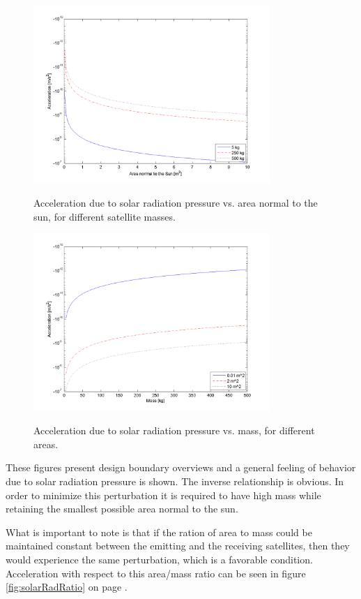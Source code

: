 \begin{figure}[ht!]
\centering
\includegraphics[width=0.8\textwidth, angle=0]{img/solPressureVarArea.png}
\label{fig:solarRadArea}
\caption{Acceleration due to solar radiation pressure vs. area normal to the sun, for different satellite masses.}
\end{figure}

\begin{figure}[ht!]
\centering
\includegraphics[width=0.8\textwidth, angle=0]{img/solPressureVarMass.png}
\label{fig:solarRadMass}
\caption{Acceleration due to solar radiation pressure vs. mass, for different areas.}
\end{figure}

These figures present design boundary overviews and a general feeling of behavior due to solar radiation pressure is shown. The inverse relationship is obvious. In order to minimize this perturbation it is required to have high mass while retaining the smallest possible area normal to the sun.

What is important to note is that if the ration of area to mass could be maintained constant between the emitting and the receiving satellites, then they would experience the same perturbation, which is a favorable condition. Acceleration with respect to this area/mass ratio can be seen in figure \ref{fig:solarRadRatio} on page \pageref{fig:solarRadRatio}.

